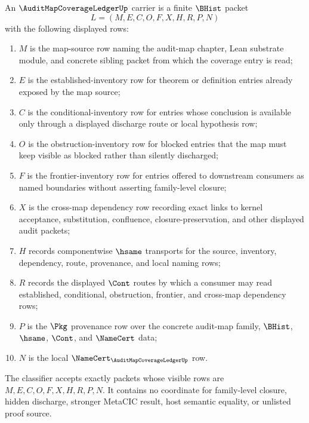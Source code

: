 \begin{definition}
\label{def:audit-map-coverage-ledger-carrier}
An $\AuditMapCoverageLedgerUp$ carrier is a finite $\BHist$ packet
$$
L=(M,E,C,O,F,X,H,R,P,N)
$$
with the following displayed rows:
\begin{enumerate}
\item $M$ is the map-source row naming the audit-map chapter, Lean substrate module, and concrete sibling packet from which the coverage entry is read;
\item $E$ is the established-inventory row for theorem or definition entries already exposed by the map source;
\item $C$ is the conditional-inventory row for entries whose conclusion is available only through a displayed discharge route or local hypothesis row;
\item $O$ is the obstruction-inventory row for blocked entries that the map must keep visible as blocked rather than silently discharged;
\item $F$ is the frontier-inventory row for entries offered to downstream consumers as named boundaries without asserting family-level closure;
\item $X$ is the cross-map dependency row recording exact links to kernel acceptance, substitution, confluence, closure-preservation, and other displayed audit packets;
\item $H$ records componentwise $\hsame$ transports for the source, inventory, dependency, route, provenance, and local naming rows;
\item $R$ records the displayed $\Cont$ routes by which a consumer may read established, conditional, obstruction, frontier, and cross-map dependency rows;
\item $P$ is the $\Pkg$ provenance row over the concrete audit-map family, $\BHist$, $\hsame$, $\Cont$, and $\NameCert$ data;
\item $N$ is the local $\NameCert_{\AuditMapCoverageLedgerUp}$ row.
\end{enumerate}
The classifier accepts exactly packets whose visible rows are $M,E,C,O,F,X,H,R,P,N$. It contains no coordinate for family-level closure, hidden discharge, stronger MetaCIC result, host semantic equality, or unlisted proof source.
\end{definition}

